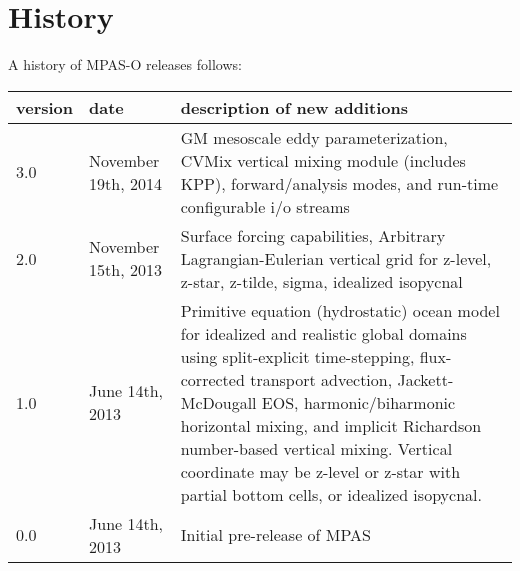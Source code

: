 \chapter*{History}
\label{chap:history}

A history of MPAS-O releases follows: \\


\begin{tabular}{ll p{4in}} 
\hline\hline version & date & description of new additions  \\
\hline 
3.0 & November 19th, 2014 & 
GM mesoscale eddy parameterization, CVMix vertical mixing module (includes KPP), forward/analysis modes, and run-time configurable i/o streams \\
\hline 
2.0 & November 15th, 2013 & 
Surface forcing capabilities, Arbitrary Lagrangian-Eulerian vertical grid for z-level, z-star, z-tilde, sigma, idealized isopycnal \\
\hline 
1.0 & June 14th, 2013 & Primitive equation (hydrostatic) ocean model for idealized and realistic global domains using split-explicit time-stepping, flux-corrected transport advection, Jackett-McDougall EOS, harmonic/biharmonic horizontal mixing, and implicit Richardson number-based vertical mixing.  Vertical coordinate may be z-level or z-star with partial bottom cells, or idealized isopycnal. \\
\hline 
0.0 & June 14th, 2013 & Initial pre-release of MPAS \\
\hline 
\end{tabular} 



\newpage

